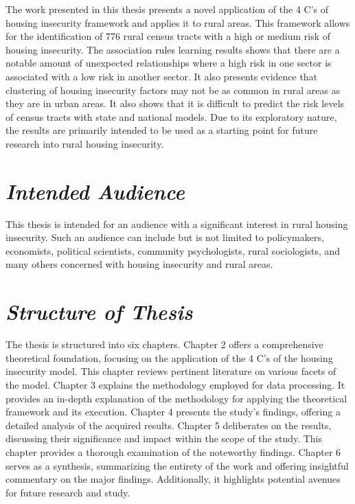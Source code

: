 The work presented in this thesis presents a novel application of the 4 C's of housing insecurity framework and applies it to rural areas. This framework allows for the identification of 776 rural census tracts with a high or medium risk of housing insecurity. The association rules learning results shows that there are a notable amount of unexpected relationships where a high risk in one sector is associated with a low risk in another sector. It also presents evidence that clustering of housing insecurity factors may not be as common in rural areas as they are in urban areas. It also shows that it is difficult to predict the risk levels of census tracts with state and national models. Due to its exploratory nature, the results are primarily intended to be used as a starting point for future research into rural housing insecurity. 

\section{\textit{Intended Audience}}
This thesis is intended for an audience with a significant interest in rural housing insecurity. Such an audience can include but is not limited to policymakers, economists, political scientists, community psychologists, rural sociologists, and many others concerned with housing insecurity and rural areas. 

\section{\textit{Structure of Thesis}}
The thesis is structured into six chapters. Chapter 2 offers a comprehensive theoretical foundation, focusing on the application of the 4 C's of the housing insecurity model. This chapter reviews pertinent literature on various facets of the model. Chapter 3 explains the methodology employed for data processing. It provides an in-depth explanation of the methodology for applying the theoretical framework and its execution. Chapter 4 presents the study's findings, offering a detailed analysis of the acquired results. Chapter 5 deliberates on the results, discussing their significance and impact within the scope of the study. This chapter provides a thorough examination of the noteworthy findings. Chapter 6 serves as a synthesis, summarizing the entirety of the work and offering insightful commentary on the major findings. Additionally, it highlights potential avenues for future research and study.

\endinput